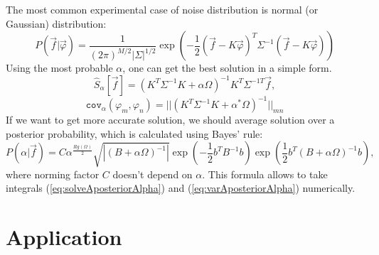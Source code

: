 \documentclass{webofc}
\begin{document}
The most common experimental case of noise distribution is normal (or Gaussian) distribution:
\begin{equation}	\label{eq:gaussP}
	P\left(\vec{f}|\vec{\varphi}\right) = \frac{1}{(2\pi)^{M/2}|\Sigma|^{1/2}} 
    \exp\left(-\frac{1}{2}(\vec{f} - K\vec{\varphi})^T\Sigma^{-1}(\vec{f} - K\vec{\varphi})\right)
\end{equation}
Using  the most probable $\alpha$, one can get the best solution in a simple form.
\begin{equation} \label{eq:analit_solv}
	\hat{S}_{\alpha}[\vec{f}] = (K^T\Sigma^{-1}K+\alpha\Omega)^{-1}K^T\Sigma^{-1T}\vec{f},
\end{equation}
\begin{equation} \label{eq:analit_var}
	\texttt{cov}_{\alpha}(\varphi_m, \varphi_n) = ||(K^T\Sigma^{-1}K+\alpha^*\Omega)^{-1}||_{mn}
\end{equation}
If we want to get more accurate solution, we should average solution over a posterior probability, which is calculated using Bayes' rule: 
\begin{equation}
	\label{eq:alphaaposter}
	P(\alpha|\vec{f}) = C \alpha^{\frac{Rg(\Omega)}{2}}\sqrt{|(B+\alpha\Omega)^{-1}|}\exp(-\frac{1}{2}b^{T}B^{-1}b)\exp(\frac{1}{2}b^{T}(B+\alpha\Omega)^{-1}b),
\end{equation}
where norming factor $C$  doesn't depend on $\alpha$. This formula allows to take integrals (\ref{eq:solveAposteriorAlpha}) and (\ref{eq:varAposteriorAlpha}) numerically.

\section{Application}
\end{document}
